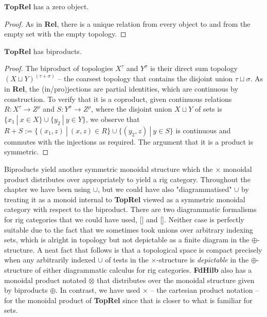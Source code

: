 \begin{fullwidth}
\begin{proposition}
$\mathbf{TopRel}$ has a zero object.
\begin{proof}
As in \textbf{Rel}, there is a unique relation from every object to and from the empty set with the empty topology.
\end{proof}
\end{proposition}

\begin{proposition}
$\mathbf{TopRel}$ has biproducts.
\begin{proof}
The biproduct of topologies $X^\tau$ and $Y^\sigma$ is their direct sum topology $(X \sqcup Y)^{(\tau + \sigma)}$ -- the coarsest topology that contains the disjoint union $\tau \sqcup \sigma$. As in \textbf{Rel}, the (in/pro)jections are partial identities, which are continuous by construction. To verify that it is a coproduct, given continuous relations $R: X^\tau \rightarrow Z^\rho$ and $S: Y^\sigma \rightarrow Z^\rho$, where the disjoint union $X \sqcup Y$ of sets is $\{x_1 \ | \ x \in X\} \cup \{y_2 \ | \ y \in Y\}$, we observe that $R + S := \{ (x_1,z) \ | \ (x,z) \in R \} \cup \{ (y_2,z) \ | \ y \in S \}$ is continuous and commutes with the injections as required. The argument that it is a product is symmetric.
\end{proof}
\end{proposition}

\begin{remark}
Biproducts yield another symmetric monoidal structure which the $\times$ monoidal product distributes over appropriately to yield a rig category. Throughout the chapter we have been using $\cup$, but we could have also "diagrammatised" $\cup$ by treating it as a monoid internal to \textbf{TopRel} viewed as a symmetric monoidal category with respect to the biproduct. There are two diagrammatic formalisms for rig categories that we could have used, [] and []. Neither case is perfectly suitable due to the fact that we sometimes took unions over arbitrary indexing sets, which is alright in topology but not depictable as a finite diagram in the $\oplus$-structure. A neat fact that follows is that a topological space is compact precisely when any arbitrarily indexed $\cup$ of tests in the $\times$-structure is \emph{depictable} in the $\oplus$-structure of either diagrammatic calculus for rig categories. \textbf{FdHilb} also has a monoidal product notated $\otimes$ that distributes over the monoidal structure given by biproducts $\oplus$. In contrast, we have used $\times$ -- the cartesian product notation -- for the monoidal product of \textbf{TopRel} since that is closer to what is familiar for sets.
\end{remark}


\end{fullwidth}
